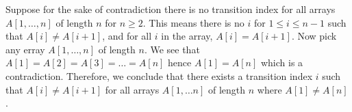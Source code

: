 \begin{parts}
\begin{customsolutionbox}
            Suppose for the sake of contradiction there is no transition index for all arrays $A[1, \ldots, n]$ of length $n$ 
            for $n \geq 2$. This means there is no $i$ for $1 \leq i \leq n-1$ such that $A[i] \not= A[i+1]$, and
            for all $i$ in the array, $A[i] = A[i+1]$. Now pick any erray $A[1, \ldots, n]$ of length $n$. We see that 
            $A[1]=A[2]=A[3]= \ldots =A[n]$ hence $A[1] = A[n]$ which is a contradiction. Therefore, we conclude that there 
            exists a transition index $i$ such that $A[i] \not= A[i+1]$ for all arrays $A[1, \ldots n]$ of 
            length $n$ where $A[1] \ne A[n]$.
        \end{customsolutionbox}


\end{parts}
